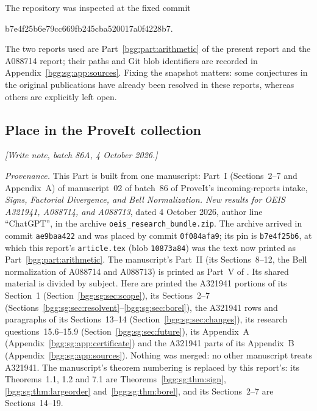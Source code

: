 \documentclass[11pt,a4paper]{article}
\numberwithin{equation}{section}
\theoremstyle{definition}
\theoremstyle{remark}
\theoremstyle{definition}
\begin{document}
The repository was inspected at the fixed commit
\begin{center}\small\ttfamily
b7e4f25b6e79cc669fb245cba520017a0f4228b7.
\end{center}
The two reports used are Part~\ref{bgg:part:arithmetic} of the present
report and the A088714 report; their paths and Git blob identifiers are
recorded in Appendix~\ref{bgg:sg:app:sources}. Fixing the snapshot
matters: some conjectures in the original publications have already
been resolved in these reports, whereas others are explicitly left
open.

\subsection{Place in the ProveIt collection}
\label{bgg:sg:sec:collection}

\emph{[Write note, batch 86A, 4 October 2026.]}

\emph{Provenance.} This Part is built from one manuscript: Part~I
(Sections~2--7 and Appendix~A) of manuscript~02 of batch~86 of
ProveIt's incoming-reports intake, \emph{Signs, Factorial Divergence,
and Bell Normalization. New results for OEIS A321941, A088714, and
A088713}, dated 4 October 2026, author line ``ChatGPT'', in the archive
\texttt{oeis\_research\_bundle.zip}. The archive arrived in commit
\texttt{ae9baa422} and was placed by commit \texttt{0f084afa9}; its pin is
\texttt{b7e4f25b6}, at which this report's \texttt{article.tex} (blob
\texttt{10873a84}) was the text now printed as Part~\ref{bgg:part:arithmetic}.
The manuscript's Part~II (its Sections~8--12, the Bell normalization of
A088714 and A088713) is printed as Part~V of
.
Its shared material is divided by subject. Here are printed the A321941
portions of its Section~1 (Section~\ref{bgg:sg:sec:scope}), its
Sections~2--7 (Sections~\ref{bgg:sg:sec:resolvent}--\ref{bgg:sg:sec:borel}),
the A321941 rows and paragraphs of its Sections~13--14
(Section~\ref{bgg:sg:sec:changes}), its research questions~15.6--15.9
(Section~\ref{bgg:sg:sec:future}), its Appendix~A
(Appendix~\ref{bgg:sg:app:certificate}) and the A321941 parts of its
Appendix~B (Appendix~\ref{bgg:sg:app:sources}). Nothing was merged:
no other manuscript treats A321941. The manuscript's theorem
numbering is replaced by this report's: its Theorems~1.1, 1.2 and 7.1
are Theorems~\ref{bgg:sg:thm:sign}, \ref{bgg:sg:thm:largeorder}
and~\ref{bgg:sg:thm:borel}, and its Sections~2--7 are
Sections~14--19.
\end{document}
